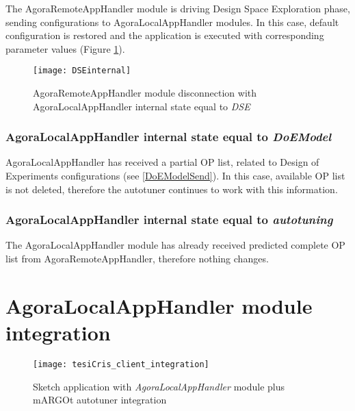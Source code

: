 The AgoraRemoteAppHandler module is driving Design Space Exploration phase, sending configurations to AgoraLocalAppHandler modules. In this case, default configuration is restored and the application is executed with corresponding parameter values (Figure \ref{fig::remDiscDSE}).

\begin{figure}[htb]

    \centering
    \texttt{[image: DSEinternal]}

    \caption{AgoraRemoteAppHandler module disconnection with A\-go\-ra\-Local\-App\-Handler internal state equal to \textit{DSE}}

    \label{fig::remDiscDSE}
    
\end{figure}


\subsubsection{AgoraLocalAppHandler internal state equal to \textit{DoEModel}}

AgoraLocalAppHandler has received a partial OP list, related to Design of Experiments configurations (see \ref{DoEModelSend}). In this case, available OP list is not deleted, therefore the autotuner continues to work with this information.


\subsubsection{AgoraLocalAppHandler internal state equal to \textit{autotuning}}

The AgoraLocalAppHandler module has already received predicted complete OP list from AgoraRemoteAppHandler, therefore nothing changes.





\section{AgoraLocalAppHandler module integration}

\begin{figure}[htb]

    \centering
    \texttt{[image: tesiCris\_client\_integration]}

    \caption{Sketch application with \textit{AgoraLocalAppHandler} module plus mARGOt autotuner integration}

    \label{fig::sketchApp}
    
\end{figure}

